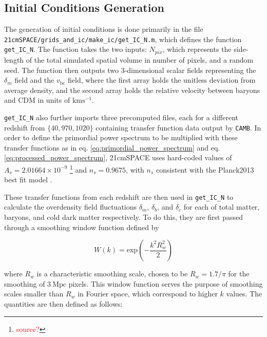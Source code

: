 \documentclass[floats,floatfix,showpacs,amssymb,prd,superscriptaddress,nofootinbib]{revtex4-2} %
\newcommand{\code}{\texttt}
\newcommand{\red}{\textcolor{red}}
\begin{document}
\subsection{Initial Conditions Generation}

The generation of initial conditions is done primarily in the file \code{21cmSPACE/grids\_and\_ic/make\_ic/get\_IC\_N.m}, which defines the function \code{get\_IC\_N}. The function takes the two inputs: $N_{pix}$, which represents the side-length of the total simulated spatial volume in number of pixels, and a random seed. The function then outputs two 3-dimensional scalar fields representing the $\delta_m$ field and the $v_{\text{bc}}$ field, where the first array holds the unitless deviation from average density, and the second array holds the relative velocity between baryons and CDM in units of $\text{km} \text{s}^{-1}$. 

\code{get\_IC\_N} also further imports three precomputed files, each for a different redshift from $\{40, 970, 1020\}$ containing transfer function data output by \code{CAMB}. In order to define the primordial power spectrum to be multiplied with these transfer functions as in eq. \ref{eq:primordial_power_spectrum} and eq. \ref{eq:processed_power_spectrum}, 21cmSPACE uses hard-coded values of $A_s = 2.01664 \times 10^{-9}$ \footnote{\red{source?}} and $n_s = 0.9675$, with $n_s$ consistent with the Planck2013 best fit model \citep{Planck2013results}. 

These transfer functions from each redshift are then used in \code{get\_IC\_N} to calculate the overdensity field fluctuations $\delta_m$, $\delta_b$, and $\delta_c$ for each of total matter, baryons, and cold dark matter respectively. To do this, they are first passed through a smoothing window function defined by 

\begin{equation}
    W(k) = \text{exp}\left( -\frac{k^2 R_w ^2}{2} \right)
\end{equation}

\noindent where $R_w$ is a characteristic smoothing scale, chosen to be $R_w = 1.7 / \pi$ for the smoothing of $3 ~\text{Mpc}$ pixels.
This window function serves the purpose of smoothing scales smaller than $R_w$ in Fourier space, which correspond to higher $k$ values. The quantities are then defined as follows:
\end{document}
